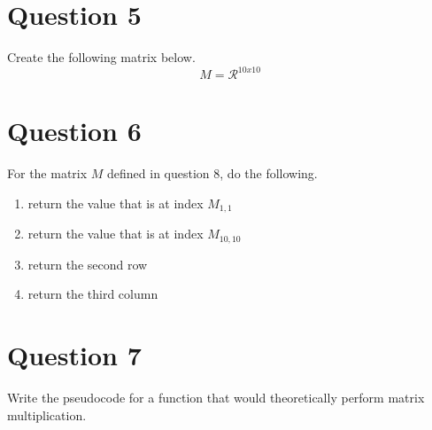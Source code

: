 \documentclass[12pt]{article}
\begin{document}
	\section{Question 5}
		Create the following matrix below.
		\begin{equation}
			M = \mathcal{R}^{10x10}
		\end{equation}

		\setcounter{equation}{0}
	\section{Question 6}
		For the matrix $M$ defined in question 8,
			do the following.
		\begin{enumerate}
			\item return the value that is at index $M_{1,1}$
			\item return the value that is at index $M_{10,10}$
			\item return the second row
			\item return the third column
		\end{enumerate}
	
	\section{Question 7}
		Write the pseudocode for a function that would theoretically perform matrix multiplication.
		

	\nocite{*}

	\newpage %
	\backmatter
	\printbibliography

	\newpage %
	\printindex

	\newpage %
	\appendix
\end{document}
